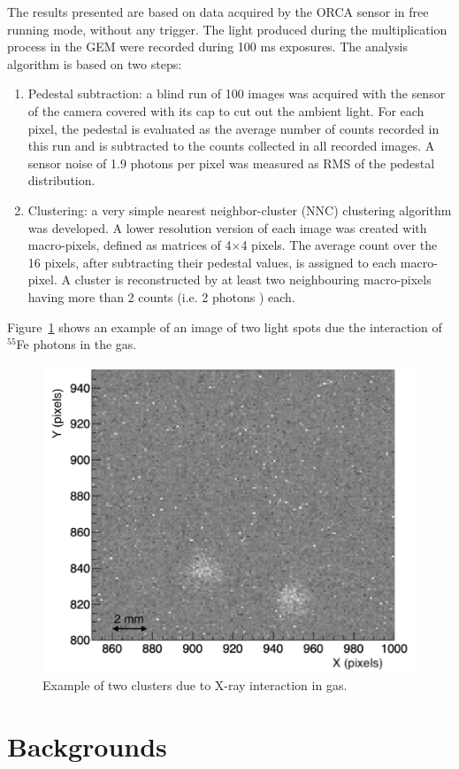 \documentclass[a4paper]{jpconf}
\begin{document}
The results presented are based on data acquired by the ORCA sensor in
free running mode, without any trigger. The light produced during the
multiplication process in the GEM were recorded during 100 ms
exposures.  The analysis algorithm is based on two steps:
\begin{enumerate}
    \item Pedestal subtraction: a blind run of 100 images was acquired
      with the sensor of the camera covered with its cap to cut out
      the ambient light. For each pixel, the pedestal is evaluated as
      the average number of counts recorded in this run and is
      subtracted to the counts collected in all recorded images. A
      sensor noise of 1.9 photons per pixel was measured as RMS of the
      pedestal distribution.
    \item Clustering: a very simple nearest neighbor-cluster
      (NNC) clustering algorithm was developed. A lower resolution
      version of each image was created with macro-pixels, defined as
      matrices of 4$\times$4 pixels.  The average count over the 16
      pixels, after subtracting their pedestal values, is assigned to
      each macro-pixel.  A cluster is reconstructed by at least two
      neighbouring macro-pixels having more than 2 counts (i.e. 2
      photons \cite{bib:jinst_orange1}) each.
\end{enumerate}

Figure~\ref{fig:spot} shows an example of an image of two light 
spots due the interaction of $^{55}$Fe photons in the gas.

\begin{figure}[htbp]
\centering
\includegraphics[width=.45\textwidth]{spot_xRay_841.png}
\caption{Example of two clusters due to X-ray interaction in gas.}
\label{fig:spot}
\end{figure}

\section{Backgrounds}
\label{sec:bkg}
\end{document}
